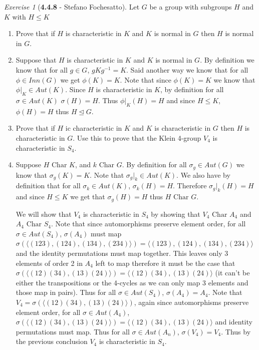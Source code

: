 \documentclass[12pt]{amsart}
\makeatletter
\theoremstyle{remark}
\newtheorem*{exercise}{Exercise}%
\renewenvironment{proof}[1][\proofname]{\par\doublespacing
  \pushQED{\qed}%
  \normalfont \topsep6\p@\@plus6\p@\relax
  \list{}{%
    \settowidth{\leftmargin}{\itshape\proofname:\hskip\labelsep}%
    \setlength{\labelwidth}{0pt}%
    \setlength{\itemindent}{-\leftmargin}%
  }%
  \item[\hskip\labelsep\itshape#1\@addpunct{:}]\ignorespaces
}{%
  \popQED\endlist\@endpefalse
  \singlespacing
}
\theoremstyle{mycomment}
\makeatother
\begin{document}
\thispagestyle{fancy}
\author{Coordinator: Oleksandr Bobrovnikov}





\begin{exercise}[\textbf{4.4.8} - Stefano Fochesatto] Let $G$ be a group with subgroups $H$ and $K$ with $H \leq K$
  \begin{enumerate}
    \item[a.] Prove that if $H$ is characteristic in $K$ and $K$ is normal in $G$ then $H$ is normal in $G$.\\
    \begin{proof} Suppose that $H$ is characteristic in $K$ and $K$ is normal in $G$. By definition we know that for 
      all $g \in G$, $gKg^{-1} = K$. Said another way we know that for all $\phi \in Inn(G)$ we get $\phi(K) = K$. Note 
      that since $\phi(K) = K$ we know that $\phi|_K \in Aut(K)$. Since $H$ is characteristic in $K$, by definition for all $\sigma \in Aut(K)$
      $\sigma(H) = H$. Thus $\phi|_K(H) = H$ and since $H \leq K$, $\phi(H) = H$ thus $H \trianglelefteq G$. 
      
    \end{proof}
    \item[b.] Prove that if $H$ ic characteristic in $K$ and $K$ is characteristic in $G$ then $H$ is characteristic in $G$. Use this to prove 
    that the Klein 4-group $V_4$ is characteristic in $S_4$.
    \begin{proof}
      Suppose $H \text{ Char } K$, and $k \text{ Char } G$. By definition  for all $\sigma_g \in Aut(G)$ we know that 
      $\sigma_g(K) = K$. Note that $\sigma_g|_k \in Aut(K)$. We also have by definition that for all $\sigma_k \in Aut(K)$, $\sigma_k(H) = H$. 
      Therefore $\sigma_g|_k(H) = H$ and since $H \leq K$ we get that $\sigma_g(H) = H$ thus $H \text{ Char } G$.
      

      We will show that $V_4$ is characteristic in $S_4$ by showing that $V_4\text{ Char }A_4$ and $A_4\text{ Char }S_4$. Note that since automorphisms preserve 
      element order, for all $\sigma \in Aut(S_4)$, $\sigma(A_4)$ must map $\sigma(\langle(123), (124), (134), (234) \rangle) = \langle(123), (124), (134), (234) \rangle$ and the identity permutations must map together. This 
      leaves only 3 elements of order 2 in $A_4$ left to map therefore it must be the case that $\sigma(\langle(12)(34), (13)(24)\rangle) = \langle(12)(34), (13)(24)\rangle$ (it can't be either the transpositions or the 4-cycles as we can only map 3 elements and those map in pairs). 
      Thus for all $\sigma \in Aut(S_4)$, $\sigma(A_4) = A_4$. Note that $V_4 = \sigma(\langle(12)(34), (13)(24)\rangle)$, again since automorphisms preserve element order, for all $\sigma \in Aut(A_4)$, $\sigma(\langle(12)(34), (13)(24)\rangle) = \langle(12)(34), (13)(24)\rangle$ and 
      identity permutations must map. Thus for all $\sigma \in Aut(A_n)$, $\sigma(V_4) = V_4$. Thus by the previous conclusion $V_4$ is characteristic in $S_4$. 
    \end{proof}



\end{enumerate}
\end{exercise}
\end{document}
